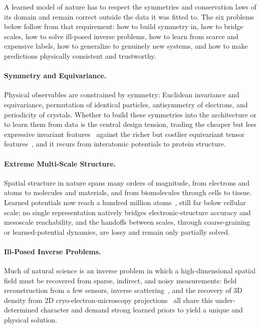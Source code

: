 A learned model of nature has to respect the symmetries and conservation laws of its domain and remain correct outside the data it was fitted to. The six problems below follow from that requirement: how to build symmetry in, how to bridge scales, how to solve ill-posed inverse problems, how to learn from scarce and expensive labels, how to generalize to genuinely new systems, and how to make predictions physically consistent and trustworthy.

\paragraph{Symmetry and Equivariance.} Physical observables are constrained by symmetry: Euclidean invariance and equivariance, permutation of identical particles, antisymmetry of electrons, and periodicity of crystals. Whether to build these symmetries into the architecture or to learn them from data is the central design tension, trading the cheaper but less expressive invariant features~\cite{schutt2017schnet} against the richer but costlier equivariant tensor features~\cite{batzner2022e3}, and it recurs from interatomic potentials to protein structure.

\paragraph{Extreme Multi-Scale Structure.} Spatial structure in nature spans many orders of magnitude, from electrons and atoms to molecules and materials, and from biomolecules through cells to tissue. Learned potentials now reach a hundred million atoms~\cite{musaelian2023learning}, still far below cellular scale; no single representation natively bridges electronic-structure accuracy and mesoscale reachability, and the handoffs between scales, through coarse-graining or learned-potential dynamics, are lossy and remain only partially solved.

\paragraph{Ill-Posed Inverse Problems.} Much of natural science is an inverse problem in which a high-dimensional spatial field must be recovered from sparse, indirect, and noisy measurements: field reconstruction from a few sensors, inverse scattering~\cite{wei2019deep}, and the recovery of 3D density from 2D cryo-electron-microscopy projections~\cite{zhong2021cryodrgn} all share this under-determined character and demand strong learned priors to yield a unique and physical solution.

